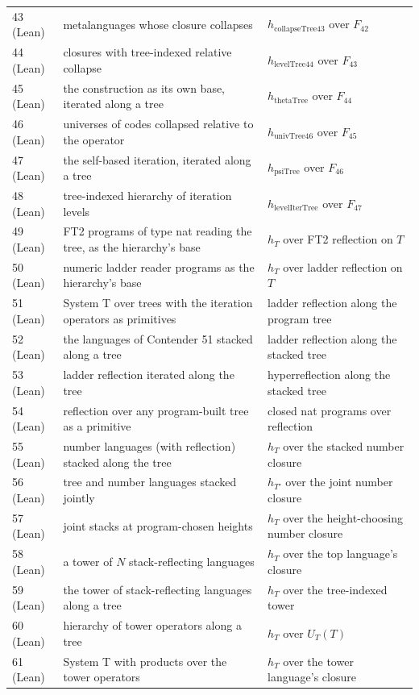 \documentclass[11pt]{article}
\theoremstyle{definition}
\theoremstyle{remark}
\begin{document}
\begin{center}
\begin{tabular}{lll}
43 (Lean) & metalanguages whose closure collapses & $h_{\mathrm{collapseTree43}}$ over $F_{42}$\\
44 (Lean) & closures with tree-indexed relative collapse & $h_{\mathrm{levelTree44}}$ over $F_{43}$\\
45 (Lean) & the construction as its own base, iterated along a tree & $h_{\mathrm{thetaTree}}$ over $F_{44}$\\
46 (Lean) & universes of codes collapsed relative to the operator & $h_{\mathrm{univTree46}}$ over $F_{45}$\\
47 (Lean) & the self-based iteration, iterated along a tree & $h_{\mathrm{psiTree}}$ over $F_{46}$\\
48 (Lean) & tree-indexed hierarchy of iteration levels & $h_{\mathrm{levelIterTree}}$ over $F_{47}$\\
49 (Lean) & FT2 programs of type nat reading the tree, as the hierarchy's base & $h_T$ over FT2 reflection on $T$\\
50 (Lean) & numeric ladder reader programs as the hierarchy's base & $h_T$ over ladder reflection on $T$\\
51 (Lean) & System T over trees with the iteration operators as primitives & ladder reflection along the program tree\\
52 (Lean) & the languages of Contender 51 stacked along a tree & ladder reflection along the stacked tree\\
53 (Lean) & ladder reflection iterated along the tree & hyperreflection along the stacked tree\\
54 (Lean) & reflection over any program-built tree as a primitive & closed nat programs over reflection\\
55 (Lean) & number languages (with reflection) stacked along the tree & $h_T$ over the stacked number closure\\
56 (Lean) & tree and number languages stacked jointly & $h_{T'}$ over the joint number closure\\
57 (Lean) & joint stacks at program-chosen heights & $h_T$ over the height-choosing number closure\\
58 (Lean) & a tower of $N$ stack-reflecting languages & $h_T$ over the top language's closure\\
59 (Lean) & the tower of stack-reflecting languages along a tree & $h_T$ over the tree-indexed tower\\
60 (Lean) & hierarchy of tower operators along a tree & $h_T$ over $U_T(T)$\\
61 (Lean) & System T with products over the tower operators & $h_T$ over the tower language's closure\\

\end{tabular}
\end{center}
\end{document}
